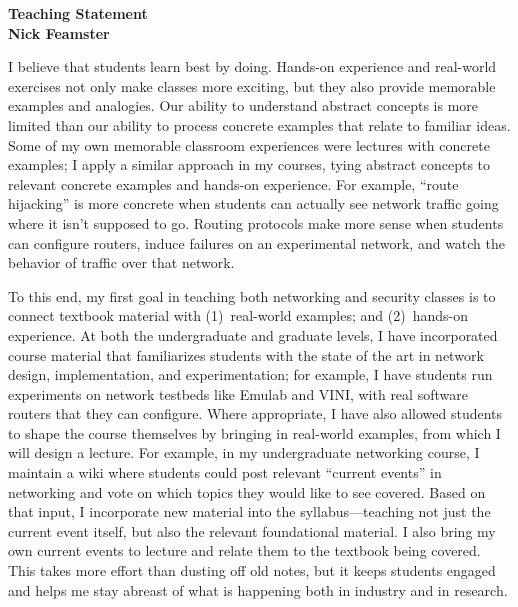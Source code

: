 \newpage \setcounter{page}{1}

\begin{center}
{\Large\textbf{Teaching Statement}}\\[0.1in] {\large\textbf{Nick
Feamster}}\\
\end{center}
I believe that students learn best by doing.  Hands-on experience and
real-world exercises not only make classes more exciting, but they
also provide memorable examples and analogies.  Our ability to
understand abstract concepts is more limited than our ability to process
concrete examples that relate to familiar ideas.  Some of
my own memorable classroom experiences were lectures with concrete
examples; I apply a similar approach in my courses, tying abstract
concepts to relevant concrete examples and hands-on experience.  For
example, ``route hijacking'' is more concrete when students can
actually see network traffic going where it isn't supposed to go.
Routing protocols make more sense when students can configure routers,
induce failures on an experimental network, and watch the behavior of
traffic over that network.

To this end, my first goal in teaching both networking and security
classes is to connect textbook material with (1)~real-world examples;
and (2)~hands-on experience.  At both the undergraduate and graduate
levels, I have incorporated course material that familiarizes students
with the state of the art in network design, implementation, and
experimentation; for example, I have students run experiments on network
testbeds like Emulab and VINI, with real software routers that they can
configure.  Where appropriate, I have also allowed students to shape the
course themselves by bringing in real-world examples, from which I will
design a lecture.  For example, in my undergraduate networking course, I
maintain a wiki where students could post relevant ``current events'' in
networking and vote on which topics they would like to see covered.
Based on that input, I incorporate new material into the
syllabus---teaching not just the current event itself, but also the
relevant foundational material.  I also bring my own current events to
lecture and relate them to the textbook being covered.  This takes more
effort than dusting off old notes, but it keeps students engaged and
helps me stay abreast of what is happening both in industry and in
research.

